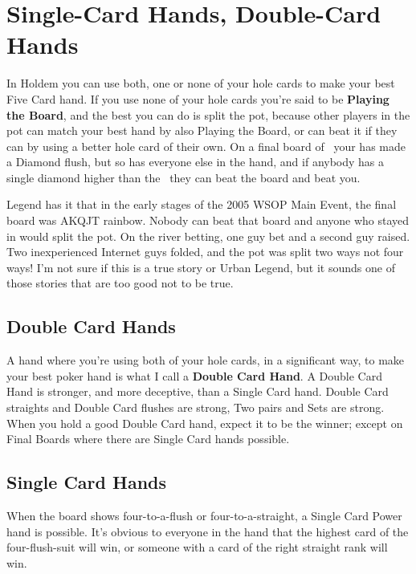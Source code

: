 \chapter{Single-Card Hands, Double-Card Hands}


In Holdem you can use both, one or none of your hole cards to make your
best Five Card hand. If you use none of your hole cards you're said to
be \textbf{Playing the Board}, and the best you can do is split the
pot, because other players in the pot can match your best hand by also
Playing the Board, or can beat it if they can by using a better hole
card of their own. On a final board of \Ad\nined\eigd\Jd\sixd\ your
\Qc\Qs has made a Diamond flush, but so has everyone else in the hand,
and if anybody has a single diamond higher than the \sixd\ they can
beat the board and beat you.

Legend has it that in the early stages of the 2005 WSOP Main Event,
the final board was AKQJT rainbow. Nobody can beat that board and
anyone who stayed in would split the pot. On the river betting, one
guy bet and a second guy raised. Two inexperienced Internet guys
folded, and the pot was split two ways not four ways! I'm not sure if
this is a true story or Urban Legend, but it sounds one of those
stories that are too good not to be true.

\section{Double Card Hands}

A hand where you're using both of your hole cards, in a significant
way, to make your best poker hand is what I call a \textbf{Double Card
Hand}. A Double Card Hand is stronger, and more deceptive, than a
Single Card hand. Double Card straights and Double Card flushes are
strong, Two pairs and Sets are strong. When you hold a good Double
Card hand, expect it to be the winner; except on Final Boards where
there are Single Card hands possible.

\section{Single Card Hands}

When the board shows four-to-a-flush or four-to-a-straight, a Single
Card Power hand is possible. It's obvious to everyone in the hand that
the highest card of the four-flush-suit will win, or someone with a
card of the right straight rank will win.


